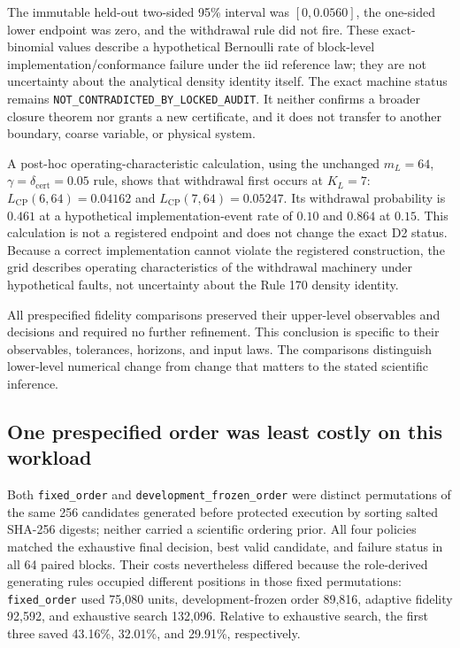 \documentclass[10pt]{article}
\theoremstyle{definition}
\begin{document}
The immutable held-out two-sided 95\% interval was \([0,0.0560]\), the one-sided lower endpoint
was zero, and the withdrawal rule did not fire. These exact-binomial values describe a hypothetical
Bernoulli rate of block-level implementation/conformance failure under the iid reference law; they
are not uncertainty about the analytical density identity itself. The exact machine status remains
\texttt{NOT\_CONTRADICTED\_BY\_LOCKED\_AUDIT}. It neither confirms a broader closure theorem nor
grants a new certificate, and it does not transfer to another boundary, coarse variable, or
physical system.

A post-hoc operating-characteristic calculation, using the unchanged \(m_L=64\),
\(\gamma=\delta_{\mathrm{cert}}=0.05\) rule, shows that withdrawal first occurs at \(K_L=7\):
\(L_{\mathrm{CP}}(6,64)=0.04162\) and \(L_{\mathrm{CP}}(7,64)=0.05247\). Its withdrawal probability
is \(0.461\) at a hypothetical implementation-event rate of \(0.10\) and \(0.864\) at \(0.15\).
This calculation is not a registered endpoint and does not change the exact D2 status. Because a
correct implementation cannot violate the registered construction, the grid describes operating
characteristics of the withdrawal machinery under hypothetical faults, not uncertainty about the
Rule 170 density identity.

All prespecified fidelity comparisons preserved their upper-level observables and decisions and
required no further refinement. This conclusion is specific to their observables, tolerances,
horizons, and input laws.
The comparisons distinguish lower-level numerical change from change that matters to the stated
scientific inference.

\subsection{One prespecified order was least costly on this workload}

Both \texttt{fixed\_order} and \texttt{development\_frozen\_order} were distinct permutations of
the same 256 candidates generated before protected execution by sorting salted SHA-256 digests;
neither carried a scientific ordering prior. All four policies matched the exhaustive final
decision, best valid candidate, and failure status in all 64 paired blocks. Their costs nevertheless
differed because the role-derived generating rules occupied different positions in those fixed
permutations: \texttt{fixed\_order} used 75,080
units, development-frozen order 89,816, adaptive fidelity 92,592, and exhaustive search 132,096.
Relative to exhaustive search, the first three saved 43.16\%, 32.01\%, and 29.91\%, respectively.
\end{document}
